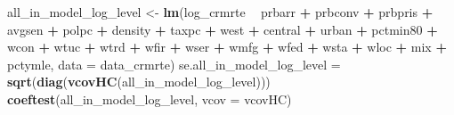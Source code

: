 \documentclass[
]{article}
\newenvironment{Shaded}{\begin{snugshade}}{\end{snugshade}}
\newcommand{\DataTypeTok}[1]{\textcolor[rgb]{0.13,0.29,0.53}{#1}}
\newcommand{\KeywordTok}[1]{\textcolor[rgb]{0.13,0.29,0.53}{\textbf{#1}}}
\newcommand{\NormalTok}[1]{#1}
\newcommand{\OperatorTok}[1]{\textcolor[rgb]{0.81,0.36,0.00}{\textbf{#1}}}
\newcommand{\StringTok}[1]{\textcolor[rgb]{0.31,0.60,0.02}{#1}}
\begin{document}
\begin{Shaded}
\begin{Highlighting}[]
\NormalTok{all_in_model_log_level <-}\StringTok{ }\KeywordTok{lm}\NormalTok{(log_crmrte }\OperatorTok{~}\StringTok{ }\NormalTok{prbarr }\OperatorTok{+}\StringTok{ }\NormalTok{prbconv }\OperatorTok{+}\StringTok{ }\NormalTok{prbpris }
                             \OperatorTok{+}\StringTok{ }\NormalTok{avgsen }\OperatorTok{+}\StringTok{ }\NormalTok{polpc }\OperatorTok{+}\StringTok{ }\NormalTok{density}
                             \OperatorTok{+}\StringTok{ }\NormalTok{taxpc }\OperatorTok{+}\StringTok{ }\NormalTok{west }\OperatorTok{+}\StringTok{ }\NormalTok{central }\OperatorTok{+}\StringTok{ }\NormalTok{urban }
                             \OperatorTok{+}\StringTok{ }\NormalTok{pctmin80 }\OperatorTok{+}\StringTok{ }\NormalTok{wcon}
                             \OperatorTok{+}\StringTok{ }\NormalTok{wtuc }\OperatorTok{+}\StringTok{ }\NormalTok{wtrd }\OperatorTok{+}\StringTok{ }\NormalTok{wfir }\OperatorTok{+}\StringTok{ }\NormalTok{wser }\OperatorTok{+}\StringTok{ }\NormalTok{wmfg }
                             \OperatorTok{+}\StringTok{ }\NormalTok{wfed }\OperatorTok{+}\StringTok{ }\NormalTok{wsta }\OperatorTok{+}\StringTok{ }\NormalTok{wloc}
                             \OperatorTok{+}\StringTok{ }\NormalTok{mix }\OperatorTok{+}\StringTok{ }\NormalTok{pctymle,}
                             \DataTypeTok{data =}\NormalTok{ data_crmrte)}
\NormalTok{se.all_in_model_log_level =}\StringTok{ }\KeywordTok{sqrt}\NormalTok{(}\KeywordTok{diag}\NormalTok{(}\KeywordTok{vcovHC}\NormalTok{(all_in_model_log_level)))}
\KeywordTok{coeftest}\NormalTok{(all_in_model_log_level, }\DataTypeTok{vcov =}\NormalTok{ vcovHC)}
\end{Highlighting}
\end{Shaded}
\end{document}

